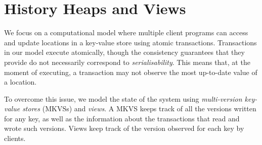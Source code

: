 
\section{History Heaps and Views}

We focus on a computational model where multiple client programs can access and update 
locations in a key-value store using atomic transactions. Transactions in our model execute atomically, 
though the consistency guarantees that they provide do not necessarily correspond to \emph{serialisability}. 
This means that, at the moment of executing, a transaction may not observe the most up-to-date value 
of a location. 

To overcome this issue, we model the state of the system using \emph{multi-version key-value stores} 
(MKVSs) and \emph{views}. A 
MKVS keeps track of all the versions written for any key, as well as the information 
about the transactions that read and wrote such versions.  Views keep track of the version observed 
for each key by clients. 

